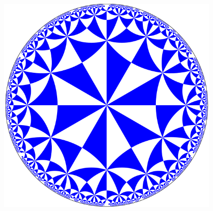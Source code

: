 \begin{figure}
        \includegraphics[width=0.85\columnwidth]{../images/wiki_hyperbolic.png}
        \label{fig:hyper_tiling}
        
    \end{figure}

